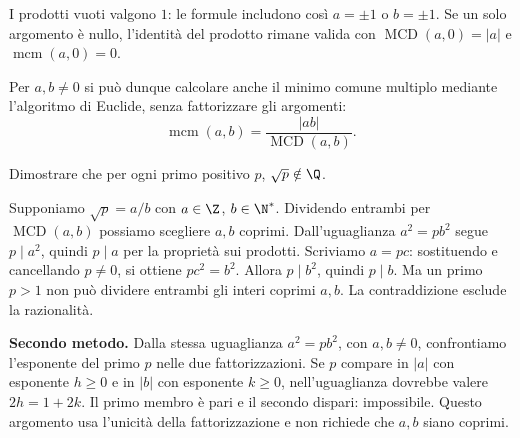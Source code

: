I prodotti vuoti valgono $1$: le formule includono così $a=\pm1$ o $b=\pm1$. Se un solo argomento è nullo, l'identità del prodotto rimane valida con $\operatorname{MCD}(a,0)=|a|$ e $\operatorname{mcm}(a,0)=0$.

Per $a,b\ne0$ si può dunque calcolare anche il minimo comune multiplo mediante l'algoritmo di Euclide, senza fattorizzare gli argomenti:
\[
\operatorname{mcm}(a,b)=\frac{|ab|}{\operatorname{MCD}(a,b)}.
\]

\begin{esercizio}
Dimostrare che per ogni primo positivo $p$, $\sqrt p\notin\Q$.
\end{esercizio}
\begin{svolgimento}
Supponiamo $\sqrt p=a/b$ con $a\in\Z$, $b\in\N^*$. Dividendo entrambi per $\operatorname{MCD}(a,b)$ possiamo scegliere $a,b$ coprimi. Dall'uguaglianza $a^2=pb^2$ segue $p\mid a^2$, quindi $p\mid a$ per la proprietà sui prodotti. Scriviamo $a=pc$: sostituendo e cancellando $p\ne0$, si ottiene $pc^2=b^2$. Allora $p\mid b^2$, quindi $p\mid b$. Ma un primo $p>1$ non può dividere entrambi gli interi coprimi $a,b$. La contraddizione esclude la razionalità.

\textbf{Secondo metodo.} Dalla stessa uguaglianza $a^2=pb^2$, con $a,b\ne0$, confrontiamo l'esponente del primo $p$ nelle due fattorizzazioni. Se $p$ compare in $|a|$ con esponente $h\ge0$ e in $|b|$ con esponente $k\ge0$, nell'uguaglianza dovrebbe valere $2h=1+2k$. Il primo membro è pari e il secondo dispari: impossibile. Questo argomento usa l'unicità della fattorizzazione e non richiede che $a,b$ siano coprimi.
\end{svolgimento}
